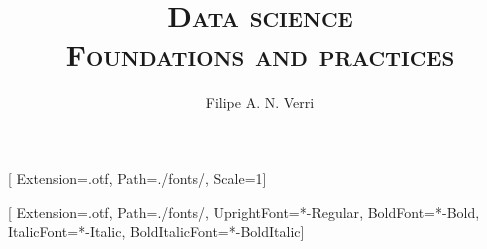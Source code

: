 \documentclass[twoside,a5paper]{memoir}
\begin{document}
[
  Extension={.otf},
  Path={./fonts/},
  Scale=1]

\setmainfont{STIXTwoText}[
  Extension={.otf},
  Path={./fonts/},
  UprightFont={*-Regular},
  BoldFont={*-Bold},
  ItalicFont={*-Italic},
  BoldItalicFont={*-BoldItalic}]

\title{\scshape Data science \\ \large Foundations and practices}
\author{Filipe A. N. Verri}

\maketitle
\thispagestyle{empty}
\clearpage

\newpage
\ %
\thispagestyle{empty}
\newpage

\tableofcontents
\thispagestyle{empty}









\printbibliography
\end{document}
